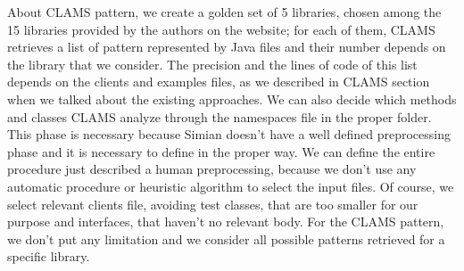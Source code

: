 About CLAMS pattern, we create a golden set of 5 libraries, chosen among the 15 libraries provided by the authors on the website; for each of them, CLAMS retrieves a list of pattern represented by Java files and their number depends on the library that we consider. The precision and the lines of code of this list depends on the clients and examples files, as we described in CLAMS section when we talked about the existing approaches. We can also decide which methods and classes CLAMS analyze through the namespaces file in the proper folder. This phase is necessary because Simian doesn't have a well defined preprocessing phase and it is necessary to define in the proper way. We can define the entire procedure just described a human preprocessing, because we don't use any automatic procedure or heuristic algorithm to select the input files. Of course, we select relevant clients file, avoiding test classes, that are too smaller for our purpose and interfaces, that haven't no relevant body. For the CLAMS pattern, we don't put any limitation and we consider all possible patterns retrieved for a specific library.






